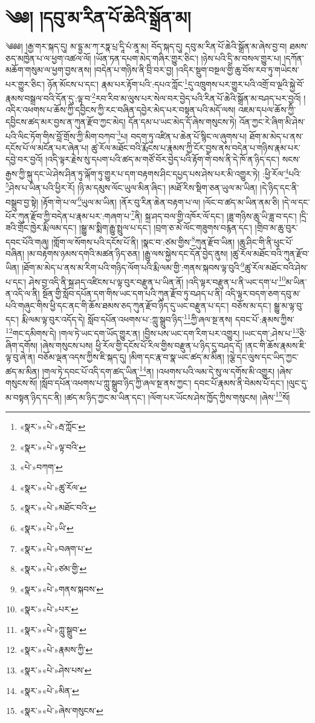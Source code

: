 \chapter{༄༅། །དབུ་མ་རིན་པོ་ཆེའི་སྒྲོན་མ།}༄༅༅། །རྒྱ་གར་སྐད་དུ། མ་དྷྱ་མ་ཀ་རཏྣ་པྲ་དཱི་པཾ་ནཱ་མ། བོད་སྐད་དུ། དབུ་མ་རིན་པོ་ཆེའི་སྒྲོན་མ་ཞེས་བྱ་བ། ཐམས་ཅད་མཁྱེན་པ་ལ་ཕྱག་འཚལ་ལོ། །ཡོན་ཏན་དཔག་མེད་གཞིར་གྱུར་ཅིང་། །ཉེས་པའི་དྲི་མ་བསལ་གྱུར་པ། །དཀོན་མཆོག་གསུམ་ལ་ཕྱག་བྱས་ནས། །བདེན་པ་གཉིས་ནི་བྲི་བར་བྱ། །འདིར་སྡུག་བསྔལ་གྱི་ཆུ་བོས་རབ་ཏུ་གཡེངས་པར་གྱུར་ཅིང་། ཉོན་མོངས་པ་དང་། རྣམ་པར་རྟོག་པའི་:དཔའ་ཀློང་\footnote{«སྣར་»«པེ་»རྦ་ཀློང་}དུ་འཁྲུགས་པར་གྱུར་པའི་འགྲོ་བ་ལྔའི་སྐྱེ་བོ་རྣམས་བསྒྲལ་བའི་དོན་དུ་:ལྟ་བ་\footnote{«སྣར་»«པེ་»ལྟ་བའི་}རབ་རིབ་མ་ལུས་པར་སེལ་བར་བྱེད་པའི་རིན་པོ་ཆེའི་སྒྲོན་མ་བཤད་པར་བྱའོ། །འདིར་འཕགས་པ་ཆོས་ཀྱི་དབྱིངས་ཀྱི་རང་བཞིན་དབྱེར་མེད་པར་བསྟན་པའི་མདོ་ལས། འཇམ་དཔལ་ཆོས་ཀྱི་དབྱིངས་ཚད་མར་བྱས་ན་ཀུན་རྫོབ་ཀྱང་མེད། དོན་དམ་པ་ཡང་མེད་དོ་ཞེས་གསུངས་ཏེ། འོན་ཀྱང་རེ་ཞིག་མི་ཤེས་པའི་ལིང་ཏོག་གིས་བློ་གྲོས་ཀྱི་མིག་བཀབ་\footnote{«པེ་»བཀག་}པ། བདག་ཏུ་འཛིན་པ་ཆེན་པོ་སྙིང་ལ་ཞུགས་པ། ཐོག་མ་མེད་པ་ནས་དངོས་པོ་ལ་མངོན་པར་ཞེན་པ། ཚུ་རོལ་མཐོང་བའི་རྨོངས་པ་རྣམས་ཀྱི་ངོར་བྱས་ནས་བདེན་པ་གཉིས་རྣམ་པར་དབྱེ་བར་བྱའོ། །འདི་ལྟར་རྗེས་སུ་དཔག་པའི་ཚད་མ་གཙོ་བོར་བྱེད་པའི་རྟོག་གེ་བས་ནི་དེ་ཁོ་ན་ཉིད་དང་། སངས་རྒྱས་ཀྱི་སྐུ་དང་ཡེ་ཤེས་ཤིན་ཏུ་ལྐོག་ཏུ་གྱུར་པ་དག་བརྟགས་ཤིང་དཔྱད་པས་ཤེས་པར་མི་འགྱུར་ཏེ། :ཕྱི་རོལ་\footnote{«སྣར་»«པེ་»ཚུ་རོལ་}པའི་\footnote{«སྣར་»«པེ་»མཐོང་བའི་}ཤེས་པ་ཡིན་པའི་ཕྱིར་རོ། །ཉི་མ་དམུས་ལོང་ཡུལ་མིན་ཞིང་། །མཐོ་རིས་སྡིག་ཅན་ཡུལ་མ་ཡིན། །དེ་ཉིད་དང་ནི་བསྒྲུབ་བྱ་སྟེ། །རྟོག་གེ་པ་ལ་\footnote{«སྣར་»«པེ་»ཡི་}ཡུལ་མ་ཡིན། །ནོར་བུ་རིན་ཆེན་བརྟག་པ་ལ། །ལོང་བ་ཚད་མ་ཡིན་ནམ་ཅི། །དེ་ལ་དང་པོར་ཀུན་རྫོབ་ཀྱི་བདེན་པ་རྣམ་པར་:གཞག་པ་\footnote{«སྣར་»«པེ་»བཞག་པ་}ནི། སྐྲ་ཤད་བལ་གྱི་འཁོར་ལོ་དང་། །ཟླ་གཉིས་ཆུ་ཡི་ཟླ་བ་དང་། །དྲི་ཟའི་གྲོང་ཁྱེར་རྨི་ལམ་དང་། །སྒྱུ་མ་སྨིག་རྒྱུ་སྤྲུལ་པ་དང་། །བྲག་ཅ་མེ་ལོང་གཟུགས་བརྙན་དང་། །གྲིབ་མ་ཆུ་བུར་དབང་པོའི་གཞུ། །གློག་ལ་སོགས་པའི་དངོས་པོ་ནི། །སྣང་བ་:ཙམ་གྱིས་\footnote{«སྣར་»«པེ་»ཙམ་གྱི་}ཀུན་རྫོབ་ཡིན། །ཆུ་ཤིང་གི་ནི་ཕུང་པོ་བཞིན། །མ་བརྟགས་ཉམས་དགའི་མཚན་ཉིད་ཅན། །རྒྱུ་ལས་སྐྱེས་དང་དོན་བྱེད་ནུས། །ཚུ་རོལ་མཐོང་བའི་ཀུན་རྫོབ་ཡིན། །ཐོག་མ་མེད་པ་ནས་མ་རིག་པའི་གཉིད་ལོག་པའི་རྨི་ལམ་གྱི་:གནས་སྐབས་ལྟ་བུའི་\footnote{«སྣར་»«པེ་»གནས་སྐབས་}ཚུ་རོལ་མཐོང་བའི་ཤེས་པ་དང་། ཤེས་བྱ་འདི་ནི་སྐྲ་ཤད་འཛིངས་པ་ལྟ་བུར་བརྫུན་པ་ཡིན་ནོ། །འདི་ལྟར་བརྫུན་པ་ནི་ཡང་དག་པ་\footnote{«སྣར་»«པེ་»པར་}མ་ཡིན་ན་འདི་ལ་ནི། སྔོན་གྱི་སློབ་དཔོན་དག་གིས་ཡང་དག་པའི་ཀུན་རྫོབ་ཏུ་བཤད་པ་ནི། འདི་ལྟར་བདག་ཅག་དབུ་མ་པའི་གཞུང་གིས་ཕྱི་དང་ནང་གི་ཆོས་ཐམས་ཅད་ཀུན་རྫོབ་ཉིད་དུ་ཡང་བརྫུན་པ་དང་། བཅོས་མ་དང་། སྒྱུ་མ་ལྟ་བུ་དང་། རྨི་ལམ་ལྟ་བུར་འདོད་དེ། སློབ་དཔོན་འཕགས་པ་:ཀླུ་སྒྲུབ་ཉིད་\footnote{«སྣར་»«པེ་»ཀླུ་སྒྲུབ་}ཀྱི་ཞལ་སྔ་ནས། དབང་པོ་:རྣམས་ཀྱིས་\footnote{«སྣར་»«པེ་»རྣམས་ཀྱི་}གང་དམིགས་དེ། །གལ་ཏེ་ཡང་དག་ཡོད་གྱུར་ན། །བྱིས་པས་ཡང་དག་རིག་པར་འགྱུར། །ཡང་དག་:ཤེས་པ་\footnote{«སྣར་»«པེ་»ཤེས་པས་}ཅི་ཞིག་དགོས། །ཞེས་གསུངས་པས། ཕྱི་རོལ་གྱི་དངོས་པོ་རིལ་གྱིས་བརྫུན་པ་ཉིད་དུ་བཤད་དོ། །ནང་གི་ཆོས་རྣམས་ཇི་ལྟ་བུ་ཞེ་ན། བཅོམ་ལྡན་འདས་ཀྱིས་ཇི་སྐད་དུ། །མིག་དང་རྣ་བ་སྣ་ཡང་ཚད་མ་མིན། །ལྕེ་དང་ལུས་དང་ཡིད་ཀྱང་ཚད་མ་མིན། །གལ་ཏེ་དབང་པོ་འདི་དག་ཚད་ཡིན་\footnote{«སྣར་»«པེ་»མིན་}ན། །འཕགས་པའི་ལམ་དེ་སུ་ལ་དགོས་མི་འགྱུར། །ཞེས་གསུངས་སོ། །སློབ་དཔོན་འཕགས་པ་ཀླུ་སྒྲུབ་ཉིད་ཀྱི་ཞལ་སྔ་ནས་ཀྱང་། དབང་པོ་རྣམས་ནི་བེམས་པོ་དང་། །ལུང་དུ་མ་བསྟན་ཉིད་དང་ནི། །ཚད་མ་ཉིད་ཀྱང་མ་ཡིན་དང་། །ལོག་པར་ཡོངས་ཤེས་ཁྱོད་ཀྱིས་གསུངས། །ཞེས་\footnote{«སྣར་»«པེ་»ཞེས་གསུངས་}སོ། 